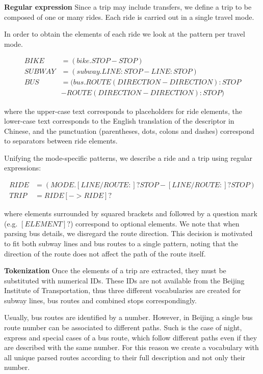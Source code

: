 \documentclass{article}
\begin{document}
\textbf{Regular expression}
Since a trip may include transfers, we define a trip to be composed of one or many rides. Each ride is carried out in a single travel mode. 

In order to obtain the elements of each ride we look at the pattern per travel mode.

    \begin{align*}
    BIKE &= (bike.STOP-STOP) \\
    SUBWAY &= (subway.LINE:STOP-LINE:STOP) \\
    BUS &= (bus.ROUTE(DIRECTION-DIRECTION):STOP \\
    &-ROUTE(DIRECTION-DIRECTION):STOP)
	\end{align*}
	
where the upper-case text corresponds to placeholders for ride elements, the lower-case text corresponds to the English translation of the descriptor in Chinese, and the punctuation (parentheses, dots, colons and dashes) correspond to separators between ride elements.

Unifying the mode-specific patterns, we describe a ride and a trip using regular expressions:
    
	\begin{align*}	        
    RIDE &= (MODE.[LINE/ROUTE:]?STOP-[LINE/ROUTE:]?STOP) \\
    TRIP &= RIDE[->RIDE]? 
	\end{align*}    
	
where elements surrounded by squared brackets and followed by a question mark (e.g. $[ELEMENT]?$) correspond to optional elements. We note that when parsing bus details, we disregard the route direction. This decision is motivated to fit both subway lines and bus routes to a single pattern, noting that the direction of the route does not affect the path of the route itself.

\textbf{Tokenization}
Once the elements of a trip are extracted, they must be substituted with numerical IDs. These IDs are not available from the Beijing Institute of Transportation, thus three different vocabularies are created for subway lines, bus routes and combined stops correspondingly. 

Usually, bus routes are identified by a number. However, in Beijing a single bus route number can be associated to different paths. Such is the case of night, express and special cases of a bus route, which follow different paths even if they are described with the same number. For this reason we create a vocabulary with all unique parsed routes according to their full description and not only their number.  
\end{document}
